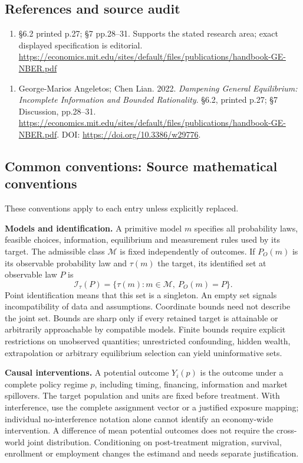 \documentclass[11pt,a4paper]{article}
\begin{document}
\subsection*{References and source audit}
\begin{enumerate}
\item §6.2 printed p.27; §7 pp.28–31. Supports the stated research area; exact displayed specification is editorial. \url{https://economics.mit.edu/sites/default/files/publications/handbook-GE-NBER.pdf}
\end{enumerate}
\begin{enumerate}\raggedright
\item\hypertarget{definitions:source:30007553:1}{} George-Marios Angeletos; Chen Lian. 2022. \emph{Dampening General Equilibrium: Incomplete Information and Bounded Rationality}. §6.2, printed p.27; §7 Discussion, pp.28–31.
\url{https://economics.mit.edu/sites/default/files/publications/handbook-GE-NBER.pdf}.
DOI: \url{https://doi.org/10.3386/w29776}.
\end{enumerate}

\subsection*{Common conventions: Source mathematical conventions}

These conventions apply to each entry unless explicitly replaced.

\textbf{Models and identification.} A primitive model \(m\) specifies all probability laws, feasible choices, information, equilibrium and measurement rules used by its target. The admissible class \(\mathcal M\) is fixed independently of outcomes. If \(P_O(m)\) is its observable probability law and \(\tau(m)\) the target, its identified set at observable law \(P\) is
\[
 \mathcal I_\tau(P)=\{\tau(m):m\in\mathcal M,\ P_O(m)=P\}.
\]
Point identification means that this set is a singleton. An empty set signals incompatibility of data and assumptions. Coordinate bounds need not describe the joint set. Bounds are sharp only if every retained target is attainable or arbitrarily approachable by compatible models. Finite bounds require explicit restrictions on unobserved quantities; unrestricted confounding, hidden wealth, extrapolation or arbitrary equilibrium selection can yield uninformative sets.

\textbf{Causal interventions.} A potential outcome \(Y_i(p)\) is the outcome under a complete policy regime \(p\), including timing, financing, information and market spillovers. The target population and units are fixed before treatment. With interference, use the complete assignment vector or a justified exposure mapping; individual no-interference notation alone cannot identify an economy-wide intervention. A difference of mean potential outcomes does not require the cross-world joint distribution. Conditioning on post-treatment migration, survival, enrollment or employment changes the estimand and needs separate justification.
\end{document}
